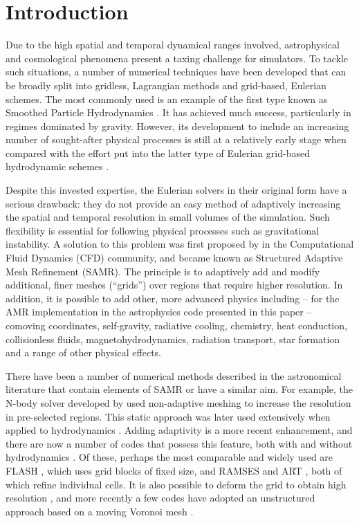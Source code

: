 \section{Introduction}\label{sec.intro}

Due to the high spatial and temporal dynamical ranges involved,
astrophysical and cosmological phenomena present a taxing challenge
for simulators. To tackle such situations, a number of numerical
techniques have been developed that can be broadly split into
gridless, Lagrangian methods and grid-based, Eulerian schemes. The
most commonly used is an example of the first type known as Smoothed
Particle Hydrodynamics \citep[SPH;][]{Lucy77, SPH}. It has achieved
much success, particularly in regimes dominated by gravity. However,
its development to include an increasing number of sought-after
physical processes is still at a relatively early stage when compared
with the effort put into the latter type of Eulerian grid-based
hydrodynamic schemes \citep[e.g.,][]{laney-1998, toro-1997,
Woodward84}.

Despite this invested expertise, the Eulerian solvers in their
original form have a serious drawback: they do not provide an easy
method of adaptively increasing the spatial and temporal resolution in
small volumes of the simulation. Such flexibility is essential for
following physical processes such as gravitational instability. A
solution to this problem was first proposed by \citet{Berger89} in the
Computational Fluid Dynamics (CFD) community, and became known as
Structured Adaptive Mesh Refinement (SAMR). The principle is to
adaptively add and modify additional, finer meshes (``grids'') over
regions that require higher resolution. In addition, it is possible to
add other, more advanced physics including -- for the AMR
implementation in the astrophysics code presented in this paper --
comoving coordinates, self-gravity, radiative cooling, chemistry, heat
conduction, collisionless fluids, magnetohydrodynamics, radiation
transport, star formation and a range of other physical effects.
\newpage

There have been a number of numerical methods described in the
astronomical literature that contain elements of SAMR or have a
similar aim. For example, the N-body solver developed by
\citet{Villumsen89} used non-adaptive meshing to increase the
resolution in pre-selected regions. This static approach was later
used extensively when applied to hydrodynamics
\citep[e.g.,][]{Ruffert94, Anninos94}. Adding adaptivity is a more
recent enhancement, and there are now a number of codes that possess
this feature, both with and without hydrodynamics \citep{Couchman91,
Jessop94, Suisalu95, Splinter96, Gelato97, ART97, Truelove98,
flash_method, MLAPM01, Yahagi01, RAMSES, Quilis04, Ziegler05, Zhang06,
Astrobear09, Pluto-amr, GAMER, Nyx}. Of these, perhaps the most
comparable and widely used are FLASH \citep{flash_method}, which uses
grid blocks of fixed size, and RAMSES \citep{RAMSES} and ART
\citep{ART97}, both of which refine individual cells. It is also
possible to deform the grid to obtain high resolution
\citep[e.g.,][]{Gnedin95, Xu97, Pen98}, and more recently a few codes
have adopted an unstructured approach based on a moving Voronoi mesh
\citep{Arepo10, Tess11}.

